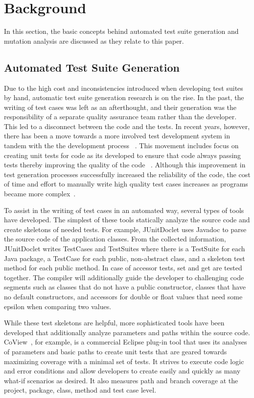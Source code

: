 \section{Background}
\label{sec:background}
In this section, the basic concepts behind automated test suite generation and mutation analysis are discussed as they relate to this paper.

\subsection{Automated Test Suite Generation}
Due to the high cost and inconsistencies introduced when developing test suites by hand, automatic test suite generation research is on the rise.  In the past, the writing of test cases was left as an afterthought, and their generation was the responsibility of a separate quality assurance team rather than the developer.  This led to a disconnect between the code and the tests.  In recent years, however, there has been a move towards a more involved test development system in tandem with the the development process ~\cite{Gelperin:1988:GST:62959.62965}.  This movement includes focus on creating unit tests for code as its developed to ensure that code always passing tests thereby improving the quality of the code ~\cite{Canfora:2006:EAT:1159733.1159788}.  Although this improvement in test generation processes successfully increased the reliability of the code, the cost of time and effort to manually write high quality test cases increases as programs became more complex~\cite{clarke1998automated}. 

To assist in the writing of test cases in an automated way, several types of tools have developed.  The simplest of these tools statically analyze the source code and create skeletons of  needed tests.  For example, JUnitDoclet \cite{JUnitDoclet} uses Javadoc to parse the source code of the application classes. From the collected information, JUnitDoclet writes TestCases and TestSuites where there is a TestSuite for each Java package, a TestCase for each public, non-abstract class, and a skeleton test method for each public method. In case of accessor tests, set and get are tested together.  The compiler will additionally guide the developer to challenging code segments such as classes that do not have a public constructor, classes that have no default constructors, and accessors for double or float values that need some epsilon when comparing two values.

While these test skeletons are helpful, more sophisticated tools have been developed that additionally analyze parameters and paths within the source code.  CoView~\cite{CoView}, for example, is a commercial Eclipse plug-in tool that uses its analyses of parameters and basic paths to create unit tests that are geared towards maximizing coverage with a minimal set of tests.  It strives to execute code logic and error conditions and allow developers to create easily and quickly as many what-if scenarios as desired. It also measures path and branch coverage at the project, package, class, method and test case level. 

